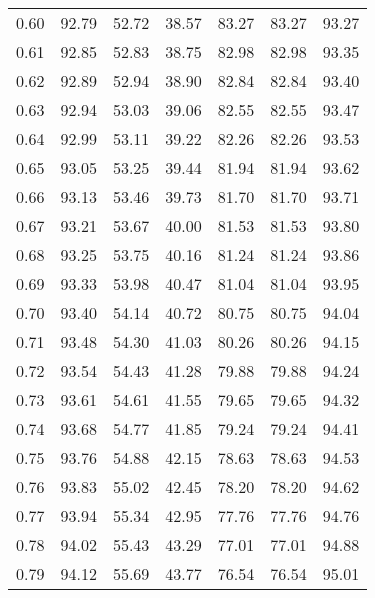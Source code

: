 \begin{tabular}{|c|c|c|c|c|c|c|}
      0.60 &     92.79 &     52.72 &      38.57 &   83.27 &      83.27 &         93.27 \\
      0.61 &     92.85 &     52.83 &      38.75 &   82.98 &      82.98 &         93.35 \\
      0.62 &     92.89 &     52.94 &      38.90 &   82.84 &      82.84 &         93.40 \\
      0.63 &     92.94 &     53.03 &      39.06 &   82.55 &      82.55 &         93.47 \\
      0.64 &     92.99 &     53.11 &      39.22 &   82.26 &      82.26 &         93.53 \\
      0.65 &     93.05 &     53.25 &      39.44 &   81.94 &      81.94 &         93.62 \\
      0.66 &     93.13 &     53.46 &      39.73 &   81.70 &      81.70 &         93.71 \\
      0.67 &     93.21 &     53.67 &      40.00 &   81.53 &      81.53 &         93.80 \\
      0.68 &     93.25 &     53.75 &      40.16 &   81.24 &      81.24 &         93.86 \\
      0.69 &     93.33 &     53.98 &      40.47 &   81.04 &      81.04 &         93.95 \\
      0.70 &     93.40 &     54.14 &      40.72 &   80.75 &      80.75 &         94.04 \\
      0.71 &     93.48 &     54.30 &      41.03 &   80.26 &      80.26 &         94.15 \\
      0.72 &     93.54 &     54.43 &      41.28 &   79.88 &      79.88 &         94.24 \\
      0.73 &     93.61 &     54.61 &      41.55 &   79.65 &      79.65 &         94.32 \\
      0.74 &     93.68 &     54.77 &      41.85 &   79.24 &      79.24 &         94.41 \\
      0.75 &     93.76 &     54.88 &      42.15 &   78.63 &      78.63 &         94.53 \\
      0.76 &     93.83 &     55.02 &      42.45 &   78.20 &      78.20 &         94.62 \\
      0.77 &     93.94 &     55.34 &      42.95 &   77.76 &      77.76 &         94.76 \\
      0.78 &     94.02 &     55.43 &      43.29 &   77.01 &      77.01 &         94.88 \\
      0.79 &     94.12 &     55.69 &      43.77 &   76.54 &      76.54 &         95.01 \\

\end{tabular}
